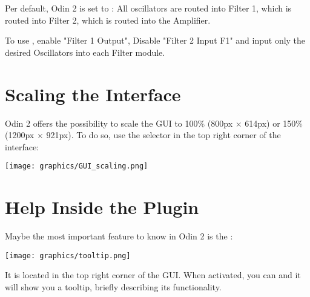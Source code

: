 \vspace{5mm}
Per default, Odin 2 is set to : All oscillators are routed into Filter 1, which is routed into Filter 2, which is routed into the Amplifier.

To use , enable "Filter 1 Output", Disable "Filter 2 Input F1" and input only the desired Oscillators into each Filter module.

\section{Scaling the Interface}
Odin 2 offers the possibility to scale the GUI to 100\% (800px $\times$ 614px) or 150\% (1200px $\times$ 921px). To do so, use the selector in the top right corner of the interface:
\begin{center}
    \texttt{[image: graphics/GUI\_scaling.png]}
\end{center}

\section{Help Inside the Plugin}
Maybe the most important feature to know in Odin 2 is the :

\begin{center}
    \texttt{[image: graphics/tooltip.png]}
\end{center}

It is located in the top right corner of the GUI. When activated, you can  and it will show you a tooltip, briefly describing its functionality.

